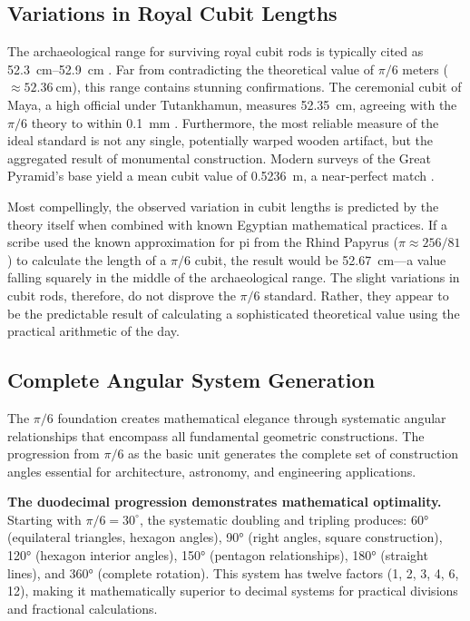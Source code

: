 \documentclass[11pt]{article}
\begin{document}
\subsection{Variations in Royal Cubit Lengths}

The archaeological range for surviving royal cubit rods is typically cited as \SIrange{52.3}{52.9}{\centi\meter} \cite{lepsius1865altagyptische}. Far from contradicting the theoretical value of $\pi/6$ meters ($\approx\SI{52.36}{\centi\meter}$), this range contains stunning confirmations. The ceremonial cubit of Maya, a high official under Tutankhamun, measures \SI{52.35}{\centi\meter}, agreeing with the $\pi/6$ theory to within \SI{0.1}{\milli\meter} \cite{imhausen2016mathematics}. Furthermore, the most reliable measure of the ideal standard is not any single, potentially warped wooden artifact, but the aggregated result of monumental construction. Modern surveys of the Great Pyramid's base yield a mean cubit value of \SI{0.5236}{\meter}, a near-perfect match \cite{dash2015survey}.

Most compellingly, the observed variation in cubit lengths is predicted by the theory itself when combined with known Egyptian mathematical practices. If a scribe used the known approximation for pi from the Rhind Papyrus ($\pi \approx 256/81$) to calculate the length of a $\pi/6$ cubit, the result would be \SI{52.67}{\centi\meter}---a value falling squarely in the middle of the archaeological range. The slight variations in cubit rods, therefore, do not disprove the $\pi/6$ standard. Rather, they appear to be the predictable result of calculating a sophisticated theoretical value using the practical arithmetic of the day.



\subsection{Complete Angular System Generation}

The $\pi/6$ foundation creates mathematical elegance through systematic angular relationships that encompass all fundamental geometric constructions. The progression from $\pi/6$ as the basic unit generates the complete set of construction angles essential for architecture, astronomy, and engineering applications.

\textbf{The duodecimal progression demonstrates mathematical optimality.} Starting with $\pi/6 = 30^\circ$, the systematic doubling and tripling produces: 60° (equilateral triangles, hexagon angles), 90° (right angles, square construction), 120° (hexagon interior angles), 150° (pentagon relationships), 180° (straight lines), and 360° (complete rotation). This system has twelve factors (1, 2, 3, 4, 6, 12), making it mathematically superior to decimal systems for practical divisions and fractional calculations.
\end{document}
